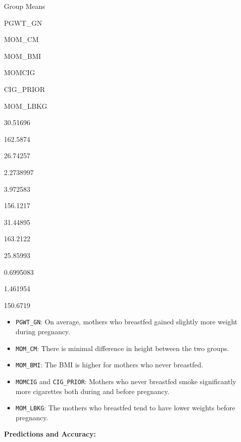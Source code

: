 \documentclass[
]{article}
\providecommand{\tightlist}{%
  \setlength{\itemsep}{0pt}\setlength{\parskip}{0pt}}
\begin{document}
Group Means

PGWT\_GN

MOM\_CM

MOM\_BMI

MOMCIG

CIG\_PRIOR

MOM\_LBKG

30.51696

162.5874

26.74257

2.2738997

3.972583

156.1217

31.44895

163.2122

25.85993

0.6995083

1.461954

150.6719

\begin{itemize}
\tightlist
\item
  \texttt{PGWT\_GN}: On average, mothers who breastfed gained slightly
  more weight during pregnancy.
\item
  \texttt{MOM\_CM}: There is minimal difference in height between the
  two groups.
\item
  \texttt{MOM\_BMI}: The BMI is higher for mothers who never breastfed.
\item
  \texttt{MOMCIG} and \texttt{CIG\_PRIOR}: Mothers who never breastfed
  smoke significantly more cigarettes both during and before pregnancy.
\item
  \texttt{MOM\_LBKG}: The mothers who breastfed tend to have lower
  weights before pregnancy.
\end{itemize}

\textbf{Predictions and Accuracy:}\\
\end{document}
